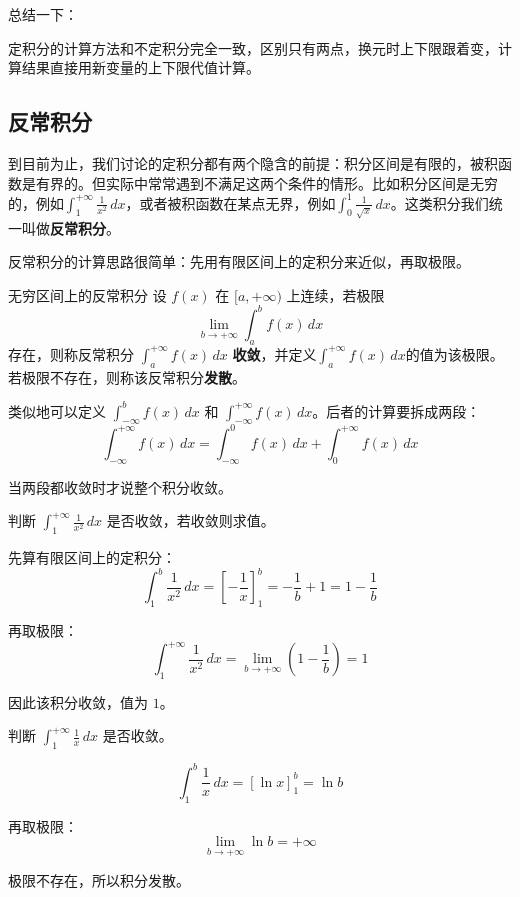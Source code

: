 总结一下：

定积分的计算方法和不定积分完全一致，区别只有两点，换元时上下限跟着变，计算结果直接用新变量的上下限代值计算。

\subsection{反常积分}

到目前为止，我们讨论的定积分都有两个隐含的前提：积分区间是有限的，被积函数是有界的。但实际中常常遇到不满足这两个条件的情形。比如积分区间是无穷的，例如$\int_1^{+\infty} \frac{1}{x^2}\,dx$，或者被积函数在某点无界，例如$\int_0^1 \frac{1}{\sqrt{x}}\,dx$。这类积分我们统一叫做\textbf{反常积分}。

反常积分的计算思路很简单：先用有限区间上的定积分来近似，再取极限。

\begin{definition}{无穷区间上的反常积分}{}
设 $f(x)$ 在 $[a, +\infty)$ 上连续，若极限
\[
\lim_{b \to +\infty} \int_a^b f(x)\, dx
\]
存在，则称反常积分 $\int_a^{+\infty} f(x)\, dx$ \textbf{收敛}，并定义$\int_a^{+\infty} f(x)\, dx$的值为该极限。若极限不存在，则称该反常积分\textbf{发散}。
\end{definition}

类似地可以定义 $\int_{-\infty}^b f(x)\,dx$ 和 $\int_{-\infty}^{+\infty} f(x)\,dx$。后者的计算要拆成两段：
\[
\int_{-\infty}^{+\infty} f(x)\, dx = \int_{-\infty}^{0} f(x)\, dx + \int_0^{+\infty} f(x)\, dx
\]

当两段都收敛时才说整个积分收敛。

\begin{myexample}
  判断 $\int_1^{+\infty} \frac{1}{x^2}\, dx$ 是否收敛，若收敛则求值。

  先算有限区间上的定积分：
  \[
  \int_1^b \frac{1}{x^2}\, dx = [-\frac{1}{x}]_1^b = -\frac{1}{b} + 1 = 1 - \frac{1}{b}
  \]

  再取极限：
  \[
  \int_1^{+\infty} \frac{1}{x^2}\, dx = \lim_{b \to +\infty} (1 - \frac{1}{b}) = 1
  \]

  因此该积分收敛，值为 $1$。
\end{myexample}

\begin{myexample}
  判断 $\int_1^{+\infty} \frac{1}{x}\, dx$ 是否收敛。

  \[
  \int_1^b \frac{1}{x}\, dx = [\ln x]_1^b = \ln b
  \]

  再取极限：
  \[\lim_{b \to +\infty} \ln b = +\infty\]
  
  极限不存在，所以积分发散。
\end{myexample}

